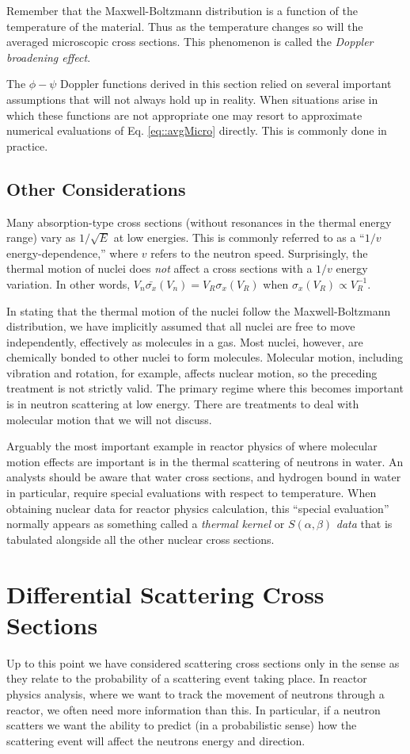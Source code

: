\documentclass[11pt]{article}
\begin{document}
Remember that the Maxwell-Boltzmann distribution is a function of the temperature of the material.  Thus as the temperature changes so will the averaged microscopic cross sections.  This phenomenon is called the \emph{Doppler broadening effect}.

The \(\phi-\psi\) Doppler functions derived in this section relied on several important assumptions that will not always hold up in reality.  When situations arise in which these functions are not appropriate one may resort to approximate numerical evaluations of Eq. \ref{eq::avgMicro} directly.  This is commonly done in practice.
\subsection{Other Considerations}
\label{sec:orgheadline8}
Many absorption-type cross sections (without resonances in the thermal energy range) vary as \(1/\sqrt{E}\) at low energies.  This is commonly referred to as a ``\(1/v\) energy-dependence,'' where \(v\) refers to the neutron speed.  Surprisingly, the thermal motion of nuclei does \emph{not} affect a cross sections with a \(1/v\) energy variation.  In other words, \(V_n \bar{\sigma_x}(V_n) = V_R\sigma_x(V_R)\) when \(\sigma_x(V_R) \propto V_R^{-1}\).

In stating that the thermal motion of the nuclei follow the Maxwell-Boltzmann distribution, we have implicitly assumed that all nuclei are free to move independently, effectively as molecules in a gas.  Most nuclei, however, are chemically bonded to other nuclei to form molecules.  Molecular motion, including vibration and rotation, for example, affects nuclear motion, so the preceding treatment is not strictly valid.  The primary regime where this becomes important is in neutron scattering at low energy. There are treatments to deal with molecular motion that we will not discuss.  

Arguably the most important example in reactor physics of where molecular motion effects are important is in the thermal scattering of neutrons in water.  An analysts should be aware that water cross sections, and hydrogen bound in water in particular, require special evaluations with respect to temperature.  When obtaining nuclear data for reactor physics calculation, this ``special evaluation'' normally appears as something called a \emph{thermal kernel} or \(S(\alpha,\beta)\) \emph{data} that is tabulated alongside all the other nuclear cross sections.
\section{Differential Scattering Cross Sections}
\label{sec:orgheadline10}
Up to this point we have considered scattering cross sections only in the sense as they relate to the probability of a scattering event taking place.  In reactor physics analysis, where we want to track the movement of neutrons through a reactor, we often need more information than this.  In particular, if a neutron scatters we want the ability to predict (in a probabilistic sense) how the scattering event will affect the neutrons energy and direction.
\end{document}
